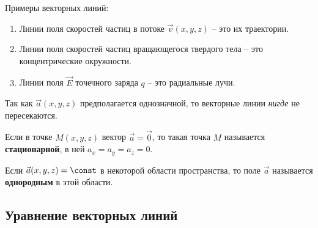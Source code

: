 	Примеры векторных линий:
	\begin{enumerate}
	\item
		Линии поля скоростей частиц в потоке \( \vec{v}(x, y, z) \) -- это их траектории.
	\item
		Линии поля скоростей частиц вращающегося твердого тела -- это концентрические окружности.
	\item
		Линии поля \( \vec{E} \) точечного заряда \( q \) -- это радиальные лучи.
	\end{enumerate}
	
	\begin{remark}
	Так как \( \vec{a}(x, y, z) \) предполагается однозначной, то векторные линии \textit{нигде} не пересекаются.
	\end{remark}
	
	\begin{remark}
	Если в точке \( M(x, y, z) \) вектор \( \vec{a} = \vec{0} \), то такая точка \( M \) называется \textbf{стационарной}, в ней \( a_x = a_y = a_z = 0 \).
	\end{remark}
	
	\begin{remark}
	Если \( \vec{a} (x, y, z) = \const \) в некоторой области пространства, то поле \( \vec{a} \) называется \textbf{однородным} в этой области.
	\end{remark}
	
\subsection{Уравнение векторных линий}

